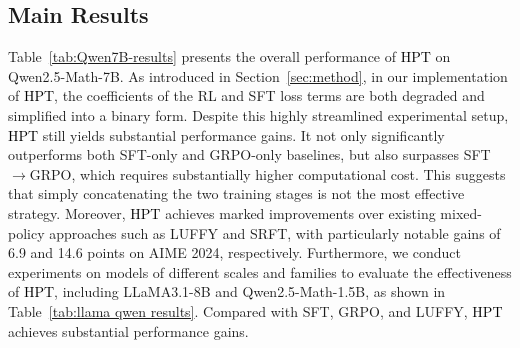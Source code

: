 \documentclass{article} %
\newcommand{\0}{\mathbb{0}}
\newcommand{\1}{\mathbb{1}}
\newcommand{\mot}{\textcolor{black}{HPT}\xspace}
\begin{document}
\subsection{Main Results}

Table~\ref{tab:Qwen7B-results} presents the overall performance of \mot on Qwen2.5-Math-7B.
As introduced in Section~\ref{sec:method}, in our implementation of \mot, the coefficients of the RL and SFT loss terms are both degraded and simplified into a binary form.
Despite this highly streamlined experimental setup, \mot still yields substantial performance gains.
It not only significantly outperforms both SFT-only and GRPO-only baselines, but also surpasses SFT$\rightarrow$GRPO, which requires substantially higher computational cost.
This suggests that simply concatenating the two training stages is not the most effective strategy.
Moreover, \mot achieves marked improvements over existing mixed-policy approaches such as LUFFY and SRFT, with particularly notable gains of 6.9 and 14.6 points on AIME 2024, respectively.
Furthermore, we conduct experiments on models of different scales and families to evaluate the effectiveness of \mot, including LLaMA3.1-8B and Qwen2.5-Math-1.5B, as shown in Table~\ref{tab:llama qwen results}.
Compared with SFT, GRPO, and LUFFY, \mot achieves substantial performance gains.
\end{document}
